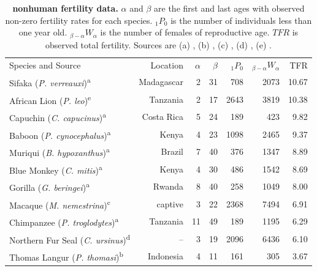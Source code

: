 \documentclass[12pt]{article}
\begin{document}
\begingroup
\renewcommand{\arraystretch}{0.75}
\begin{table}[]
\caption{\textbf{nonhuman fertility data.} $\alpha$ and $\beta$ are the first and last ages with observed non-zero fertility rates for each species. $_{1}P_0$ is the number of individuals less than one year old. $_{\beta-\alpha}W_{\alpha}$ is the number of females of reproductive age. $TFR$ is observed total fertility. Sources are 
(a) \citet{bronikowski16,bronikowskidata}, 
(b) \citet{wich2007demography},
(c) \citet{ha2000demographic},
(d) \citet{barlow1991modeling},
(e) \citet{packer1998reproductive}.}
\label{nonhuman-datasources}
\begin{tabular}{lrrrrrr}
\cline{1-7}
Species and Source        & Location   & $\alpha$ & $\beta$ & $_1P_0$ & $_{\beta-\alpha}W_\alpha$ & TFR  \\ \cline{1-7}
Sifaka (\textit{P. verreauxi})\textsuperscript{a}          & Madagascar & 2        & 31      & 708     & 2073                      & 10.67                  \\
African Lion (\textit{P. leo})\textsuperscript{e}          & Tanzania   & 2        & 17      & 2643    & 3819                      & 10.38          \\
Capuchin (\textit{C. capucinus})\textsuperscript{a}        & Costa Rica & 5        & 24      & 189     & 423                       & 9.82                   \\
Baboon (\textit{P. cynocephalus})\textsuperscript{a}       & Kenya      & 4        & 23      & 1098    & 2465                      & 9.37                   \\
Muriqui (\textit{B. hypoxanthus})\textsuperscript{a}       & Brazil     & 7        & 40      & 376     & 1347                      & 8.89                   \\
Blue Monkey (\textit{C. mitis})\textsuperscript{a}         & Kenya      & 4        & 30      & 486     & 1542                      & 8.69                   \\
Gorilla (\textit{G. beringei})\textsuperscript{a}          & Rwanda     & 8        & 40      & 258     & 1049                      & 8.00                   \\
Macaque (\textit{M. nemestrina})\textsuperscript{c}        & captive    & 3        & 22      & 2368    & 7494                      & 6.91                \\
Chimpanzee (\textit{P. troglodytes})\textsuperscript{a}    & Tanzania   & 11       & 49      & 189     & 1195                      & 6.29                   \\
Northern Fur Seal (\textit{C. ursinus})\textsuperscript{d} & --       & 3        & 19      & 2096    & 6436                      & 6.10            \\
Thomas Langur (\textit{P. thomasi})\textsuperscript{b}      & Indonesia  & 4        &   11      & 161     & 305                       & 3.67  \\
\cline{1-7}
\end{tabular}\label{nonhumantable}
\end{table}
\endgroup
\end{document}
